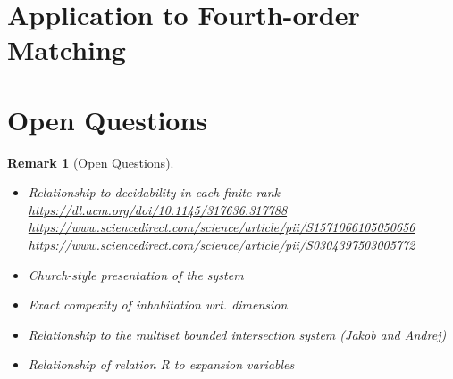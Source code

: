 \documentclass[10pt,a4paper]{article}
\theoremstyle{plain}%
\newtheorem{remark}[theorem]{Remark}
\begin{document}
\newpage

\section{Application to Fourth-order Matching}


\newpage

\section*{Open Questions}
\begin{remark}[Open Questions]
\begin{itemize}
\item Relationship to decidability in each finite rank\\
\url{https://dl.acm.org/doi/10.1145/317636.317788}\\
\url{https://www.sciencedirect.com/science/article/pii/S1571066105050656}\\
\url{https://www.sciencedirect.com/science/article/pii/S0304397503005772}
\item Church-style presentation of the system
\item Exact compexity of inhabitation wrt. dimension
\item Relationship to the multiset bounded intersection system (Jakob and Andrej)
\item Relationship of relation R to expansion variables
\end{itemize}
\end{remark}


\newpage

\printbibliography
\end{document}
